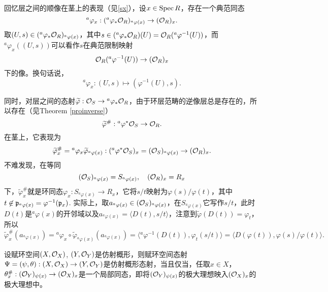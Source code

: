 \begin{para}
回忆层之间的顺像在茎上的表现（见\ref{sx}），设$x\in \operatorname{Spec} R$，存在一个典范同态
\[
	{}^a\varphi_x:({}^a\varphi_*\mathcal{O}_R)_{{}^a\varphi(x)}\to (\mathcal{O}_R)_{x}.
\]
取$(U,s)\in ({}^a\varphi_*\mathcal{O}_R)_{{}^a\varphi(x)}$，其中$s\in ({}^a\varphi_*\mathcal{O}_R)(U)=\mathcal{O}_R({}^a\varphi^{-1}(U))$，而${}^a\varphi_x((U,s))$可以看作$s$在典范限制映射
\[
	\mathcal{O}_R({}^a\varphi^{-1}(U))\to (\mathcal{O}_R)_x
\]
下的像。换句话说，
\[
	{}^a\varphi_x:(U,s)\mapsto (\varphi^{-1}(U),s).
\]

同时，对层之间的态射$\widetilde{\varphi}:\mathcal{O}_S\to {}^a\varphi_*\mathcal{O}_R$，由于环层范畴的逆像层总是存在的，所以存在（见Theorem \ref{proinverse}）
\[
	\widetilde{\varphi}^\#:{}^a\varphi^*\mathcal{O}_S\to \mathcal{O}_R.
\]
在茎上，它表现为
\[
	\widetilde{\varphi}^\#_x={}^a\varphi_x \widetilde{\varphi}_{{}^a\varphi(x)}:({}^a\varphi^*\mathcal{O}_S)_x=(\mathcal{O}_S)_{{}^a\varphi(x)}\to (\mathcal{O}_R)_x.
\]
不难发现，在等同
\[
	(\mathcal{O}_S)_{{}^a\varphi(x)}=S_{{}^a\varphi(x)},\quad (\mathcal{O}_R)_x=R_x
\]
下，$\widetilde{\varphi}^\#_x$就是环同态$\varphi_x:S_{{}^a\varphi(x)}\to R_x$，它将$s/t$映射为$\varphi(s)/\varphi(t)$，其中$t\not\in \mathfrak{p}_{{}^a\varphi(x)}=\varphi^{-1}(\mathfrak{p}_x)$. 实际上，取$a_{{}^a\varphi(x)}\in (\mathcal{O}_S)_{{}^a\varphi(x)}$，在$S_{{}^a\varphi(x)}$它写作$s/t$，此时$D(t)$是${}^a\varphi(x)$的开邻域以及$a_{{}^a\varphi(x)}=\langle D(t),s/t\rangle$，注意到$\widetilde{\varphi}(D(t))=\varphi_t$，所以
\[
	\widetilde{\varphi}^\#_x(a_{{}^a\varphi(x)})={}^a\varphi_x \circ \widetilde{\varphi}_{{}^a\varphi(x)}(a_{{}^a\varphi(x)})=\langle {}^a\varphi^{-1}(D(t)),\varphi_t(s/t)\rangle =\langle D(\varphi(t)),\varphi(s)/\varphi(t)\rangle.
\]
\end{para}

\begin{pro}
设赋环空间$(X,\mathcal{O}_X)$, $(Y,\mathcal{O}_Y)$是仿射概形，则赋环空间态射$\Psi=(\psi,\theta):(X,\mathcal{O}_X)\to (Y,\mathcal{O}_Y)$是仿射概形态射，当且仅当，任取$x\in X$，$\theta_x^\#:(\mathcal{O}_Y)_{\psi(x)}\to (\mathcal{O}_X)_x$是一个局部同态，即将$(\mathcal{O}_Y)_{\psi(x)}$的极大理想映入$(\mathcal{O}_X)_x$的极大理想中。
\end{pro}

